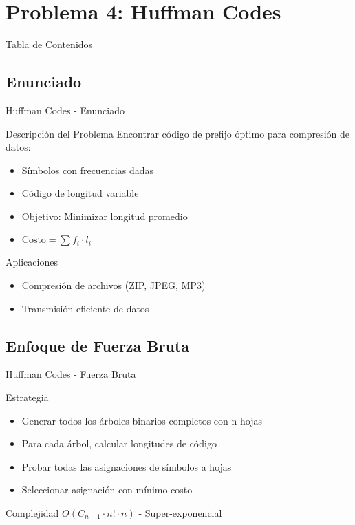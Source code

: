 \documentclass[aspectratio=169]{beamer}
\begin{document}
\section{Problema 4: Huffman Codes}

\begin{frame}{Tabla de Contenidos}
\end{frame}

\subsection{Enunciado}
\begin{frame}{Huffman Codes - Enunciado}
\begin{block}{Descripción del Problema}
Encontrar código de prefijo óptimo para compresión de datos:
\begin{itemize}
\item Símbolos con frecuencias dadas
\item Código de longitud variable
\item Objetivo: Minimizar longitud promedio
\item $\text{Costo} = \sum f_i \cdot l_i$
\end{itemize}
\end{block}

\begin{exampleblock}{Aplicaciones}
\begin{itemize}
\item Compresión de archivos (ZIP, JPEG, MP3)
\item Transmisión eficiente de datos
\end{itemize}
\end{exampleblock}
\end{frame}

\subsection{Enfoque de Fuerza Bruta}
\begin{frame}{Huffman Codes - Fuerza Bruta}
\begin{block}{Estrategia}
\begin{itemize}
\item Generar todos los árboles binarios completos con n hojas
\item Para cada árbol, calcular longitudes de código
\item Probar todas las asignaciones de símbolos a hojas
\item Seleccionar asignación con mínimo costo
\end{itemize}
\end{block}

\begin{alertblock}{Complejidad}
$O(C_{n-1} \cdot n! \cdot n)$ - Super-exponencial
\end{alertblock}
\end{frame}
\end{document}
